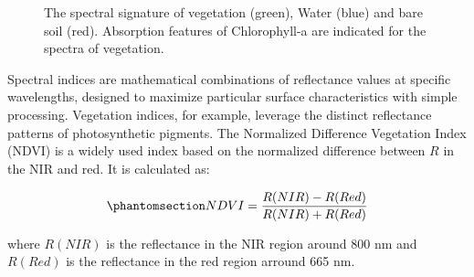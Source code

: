 \documentclass[
  letterpaper,
  11pt,
  english,
  singlespacing,
  headsepline]{MastersDoctoralThesis}
\begin{document}
\begin{spacing}{1.5}
\begin{figure}


\caption{\label{fig-Spectral_signature}The spectral signature of
vegetation (green), Water (blue) and bare soil (red). Absorption
features of Chlorophyll-a are indicated for the spectra of vegetation.}

\end{figure}%

Spectral indices are mathematical combinations of reflectance values at
specific wavelengths, designed to maximize particular surface
characteristics with simple processing. Vegetation indices, for example,
leverage the distinct reflectance patterns of photosynthetic pigments.
The Normalized Difference Vegetation Index (NDVI) is a widely used index
based on the normalized difference between \(R\) in the NIR and red. It
is calculated as:

\begin{equation}\phantomsection\label{eq-NDVI}{
NDVI = \frac{R(NIR)-R(Red)}{R(NIR)+R(Red)}
}\end{equation}

where \(R(NIR)\) is the reflectance in the NIR region around 800 nm and
\(R(Red)\) is the reflectance in the red region arround 665 nm.


\end{spacing}
\end{document}
